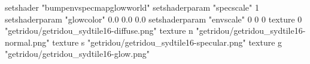 setshader "bumpenvspecmapglowworld"
setshaderparam "specscale" 1
setshaderparam "glowcolor" 0.0 0.0 0.0
setshaderparam "envscale" 0 0 0
texture 0 "getridou/getridou_sydtile16-diffuse.png"
texture n "getridou/getridou_sydtile16-normal.png"
texture s "getridou/getridou_sydtile16-specular.png"
texture g "getridou/getridou_sydtile16-glow.png"